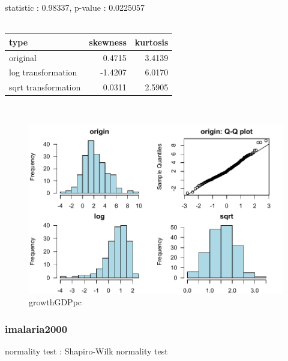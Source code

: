 \documentclass{book}\usepackage[]{graphicx}\usepackage[]{color}
\begin{document}
\noindent statistic : 0.98337,  p-value : 0.0225057\\
\\%
\begin{tabular}{lrr}
  \toprule
type & skewness & kurtosis \\ 
  \midrule
original & 0.4715 & 3.4139 \\ 
  log transformation & -1.4207 & 6.0170 \\ 
  sqrt transformation & 0.0311 & 2.5905 \\ 
   \bottomrule
\end{tabular}
\\
\begin{figure}[!ht]
\centering
\includegraphics[width=1.0\textwidth]{figure/norm4.pdf}
\caption{growthGDPpc}
\end{figure}
\clearpage
\subsubsection{ imalaria2000 }

normality test : Shapiro-Wilk normality test
\end{document}

